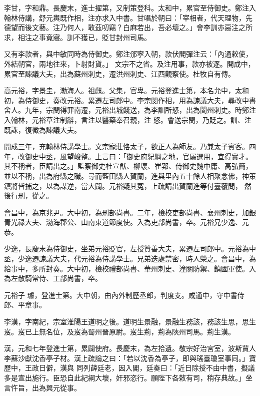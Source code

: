 \begin{pinyinscope}
 李甘，字和鼎。長慶末，進士擢第，又制策登科。太和中，累官至侍御史。鄭注入翰林侍講，舒元輿既作相，注亦求入中書。甘唱於朝曰：「宰相者，代天理物，先德望而後文藝。注乃何人，敢茲叨竊？白麻若出，吾必壞之。」會李訓亦惡注之所求，相注之事竟寢。訓不獲已，貶甘封州司馬。



 又有李款者，與中敏同時為侍御史。鄭注邠寧入朝，款伏閣彈注云：「內通敕使，外結朝官，兩地往來，卜射財貨。」
 文宗不之省。及注用事，款亦被逐。開成中，累官至諫議大夫，出為蘇州刺史，遷洪州刺史、江西觀察使。杜牧自有傳。



 高元裕，字景圭，渤海人。祖甝。父集，官卑。元裕登進士第，本名允中，太和初，為侍御史，奏改元裕。累遷左司郎中。李宗閔作相，用為諫議大夫，尋改中書舍人。九年，宗閔得罪南遷，元裕出城餞送，為李訓所怒，出為閬州刺史。時鄭注入翰林，元裕草注制辭，言注以醫藥奉召親，注
 怒。會送宗閔，乃貶之。訓、注既誅，復徵為諫議大夫。



 開成三年，充翰林侍講學士。文宗寵莊恪太子，欲正人為師友。乃兼太子賓客。四年，改御史中丞，風望峻整。上言曰：「御史府紀綱之地，官屬選用，宜得實才。其不稱者，臣請出之。」監察御史杜宣猷、柳壞、崔郢、侍御史魏中庸、高弘簡，並以不稱，出為府縣之職。尋而藍田縣人賀蘭，進與里內五十餘人相聚念佛，神策鎮將皆捕之，以為謀逆，當大闢。元裕疑其冤，上疏請出賀蘭進等付臺覆問，
 然後行刑，從之。



 會昌中，為京兆尹。大中初，為刑部尚書。二年，檢校吏部尚書、襄州刺史，加銀青光祿大夫、渤海郡公、山南東道節度使。入為吏部尚書，卒。元裕兄少逸、元恭。



 少逸，長慶末為侍御史，坐弟元裕貶官，左授贊善大夫，累遷左司郎中。元裕為中丞，少逸遷諫議大夫，代元裕為侍講學士。兄弟迭處禁密，時人榮之。會昌中，為給事中，多所封奏。大中初，檢校禮部尚書、華州刺史、潼關防禦、鎮國軍使。入為左散騎常侍、工部尚書，卒。



 元裕子
 璩，登進士第。大中朝，由內外制歷丞郎，判度支。咸通中，守中書侍郎、平章事。



 李漢，字南紀，宗室淮陽王道明之後。道明生景融，景融生務該，務該生思，思生岌。岌已上無名位，及岌為蜀州晉原尉。岌生荊，荊為陜州司馬。荊生漢。



 漢，元和七年登進士第，累闢使府。長慶末，為左拾遺。敬宗好治宮室，波斯賈人李蘇沙獻沈香亭子材。漢上疏論之曰：「若以沈香為亭子，即與瑤臺瓊室事同。」寶歷中，王政日僻，漢與
 同列薛廷老，因入閣，廷奏曰：「近日除授不由中書，擬議多是宣出施行。臣恐自此紀綱大壞，奸邪恣行。願陛下各敕有司，稍存典故。」坐言忤旨，出為興元從事。




\end{pinyinscope}
